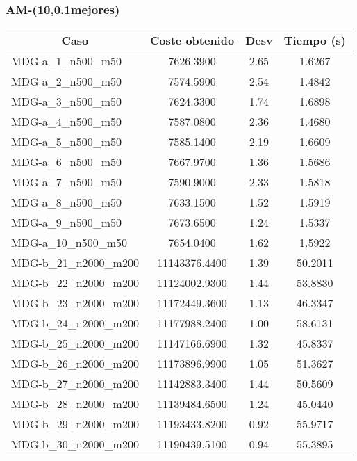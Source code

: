 \documentclass[10pt,a4paper]{article}
\begin{document}
\subsubsection{AM-(10,0.1mejores)}
\begin{table}[H]
	\begin{center}
		\begin{tabular}{|l|c|c|c|} 
			\hline
			\multicolumn{1}{|c|}{\textbf{Caso}} & \textbf{Coste obtenido} & \textbf{Desv} & \textbf{Tiempo (s)} \\ \hline
			\hline
					MDG-a\_1\_n500\_m50 & 7626.3900 & 2.65 & 1.6267 \\ \hline
					MDG-a\_2\_n500\_m50 & 7574.5900 & 2.54 & 1.4842 \\ \hline
					MDG-a\_3\_n500\_m50 & 7624.3300 & 1.74 & 1.6898 \\ \hline
					MDG-a\_4\_n500\_m50 & 7587.0800 & 2.36 & 1.4680 \\ \hline
					MDG-a\_5\_n500\_m50 & 7585.1400 & 2.19 & 1.6609 \\ \hline
					MDG-a\_6\_n500\_m50 & 7667.9700 & 1.36 & 1.5686 \\ \hline
					MDG-a\_7\_n500\_m50 & 7590.9000 & 2.33 & 1.5818 \\ \hline
					MDG-a\_8\_n500\_m50 & 7633.1500 & 1.52 & 1.5919 \\ \hline
					MDG-a\_9\_n500\_m50 & 7673.6500 & 1.24 & 1.5337 \\ \hline
					MDG-a\_10\_n500\_m50 & 7654.0400 & 1.62 & 1.5922 \\ \hline
					MDG-b\_21\_n2000\_m200 & 11143376.4400 & 1.39 & 50.2011 \\ \hline
					MDG-b\_22\_n2000\_m200 & 11124002.9300 & 1.44 & 53.8830 \\ \hline
					MDG-b\_23\_n2000\_m200 & 11172449.3600 & 1.13 & 46.3347 \\ \hline
					MDG-b\_24\_n2000\_m200 & 11177988.2400 & 1.00 & 58.6131 \\ \hline
					MDG-b\_25\_n2000\_m200 & 11147166.6900 & 1.32 & 45.8337 \\ \hline
					MDG-b\_26\_n2000\_m200 & 11173896.9900 & 1.05 & 51.3627 \\ \hline
					MDG-b\_27\_n2000\_m200 & 11142883.3400 & 1.44 & 50.5609 \\ \hline
					MDG-b\_28\_n2000\_m200 & 11139484.6500 & 1.24 & 45.0440 \\ \hline
					MDG-b\_29\_n2000\_m200 & 11193433.8200 & 0.92 & 55.9717 \\ \hline
					MDG-b\_30\_n2000\_m200 & 11190439.5100 & 0.94 & 55.3895 \\ \hline

\end{tabular}
\end{center}
\end{table}
\end{document}
